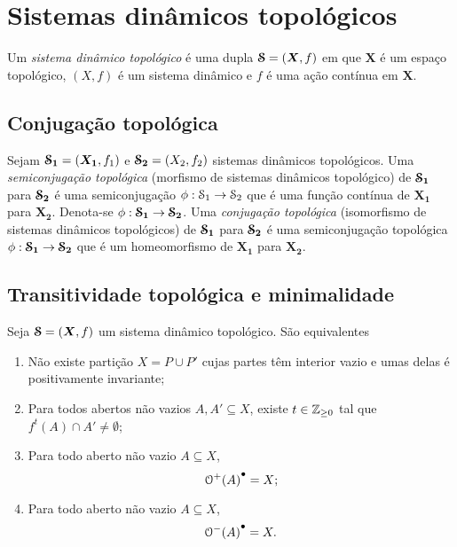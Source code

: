 \chapter{Sistemas dinâmicos topológicos}

\begin{definition}
Um \emph{sistema dinâmico topológico} é uma dupla $\bm{\mathcal{S}}=(\bm X,f)$ em que $\bm X$ é um espaço topológico, $(X,f)$ é um sistema dinâmico e $f$ é uma ação contínua em $\bm X$.
\end{definition}

\section{Conjugação topológica}

\begin{definition}
Sejam $\bm{\mathcal{S}_1} = (\bm{X_1},f_1)$ e $\bm{\mathcal{S}_2} = (X_2,f_2)$ sistemas dinâmicos topológicos. Uma \emph{semiconjugação topológica} (morfismo de sistemas dinâmicos topológico) de $\bm{\mathcal{S}_1}$ para $\bm{\mathcal{S}_2}$ é uma semiconjugação $\phi: \mathcal{S}_1 \to \mathcal{S}_2$ que é uma função contínua de $\bm{X_1}$ para $\bm{X_2}$. Denota-se $\phi: \bm{\mathcal{S}_1} \to \bm{\mathcal{S}_2}$. Uma \emph{conjugação topológica} (isomorfismo de sistemas dinâmicos topológicos) de $\bm{\mathcal{S}_1}$ para $\bm{\mathcal{S}_2}$ é uma semiconjugação topológica $\phi: \bm{\mathcal{S}_1} \to \bm{\mathcal{S}_2}$ que é um homeomorfismo de $\bm{X_1}$ para $\bm{X_2}$.
\end{definition}

\section{Transitividade topológica e minimalidade}

\begin{proposition}
Seja $\bm{\mathcal{S}} = (\bm X,f)$ um sistema dinâmico topológico. São equivalentes
	\begin{enumerate}
	\item Não existe partição $X = P \cup P'$ cujas partes têm interior vazio e umas delas é positivamente invariante;

	\item Para todos abertos não vazios $A,A' \subseteq X$, existe $t \in \mathbb{Z}_{\geq 0}$ tal que $f^t(A) \cap A' \neq \emptyset$;

	\item Para todo aberto não vazio $A \subseteq X$,
		\begin{equation*}
		{\mathcal{O}^+(A)}^\bullet = X;
		\end{equation*}

	\item Para todo aberto não vazio $A \subseteq X$,
		\begin{equation*}
		{\mathcal{O}^-(A)}^\bullet = X.
		\end{equation*}
	\end{enumerate}
\end{proposition}

